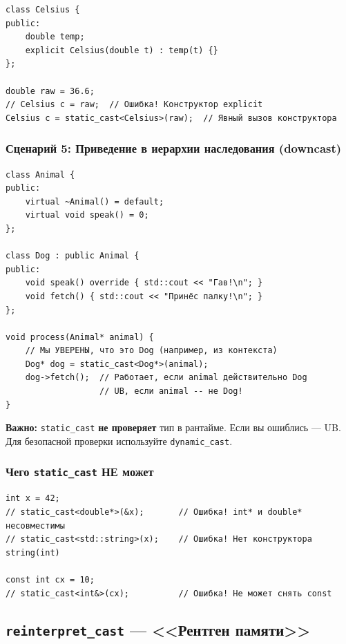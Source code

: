 \documentclass[a4paper,12pt]{article}
\begin{document}
\begin{lstlisting}
class Celsius {
public:
    double temp;
    explicit Celsius(double t) : temp(t) {}
};

double raw = 36.6;
// Celsius c = raw;  // Ошибка! Конструктор explicit
Celsius c = static_cast<Celsius>(raw);  // Явный вызов конструктора
\end{lstlisting}

\subsubsection{Сценарий 5: Приведение в иерархии наследования (downcast)}

\begin{lstlisting}
class Animal {
public:
    virtual ~Animal() = default;
    virtual void speak() = 0;
};

class Dog : public Animal {
public:
    void speak() override { std::cout << "Гав!\n"; }
    void fetch() { std::cout << "Принёс палку!\n"; }
};

void process(Animal* animal) {
    // Мы УВЕРЕНЫ, что это Dog (например, из контекста)
    Dog* dog = static_cast<Dog*>(animal);
    dog->fetch();  // Работает, если animal действительно Dog
                   // UB, если animal -- не Dog!
}
\end{lstlisting}

\textbf{Важно:} \texttt{static\_cast} \textbf{не проверяет} тип в рантайме.
Если вы ошиблись --- UB. Для безопасной проверки используйте \texttt{dynamic\_cast}.

\subsubsection{Чего \texttt{static\_cast} НЕ может}

\begin{lstlisting}
int x = 42;
// static_cast<double*>(&x);       // Ошибка! int* и double* несовместимы
// static_cast<std::string>(x);    // Ошибка! Нет конструктора string(int)

const int cx = 10;
// static_cast<int&>(cx);          // Ошибка! Не может снять const
\end{lstlisting}

\subsection{\texttt{reinterpret\_cast} --- <<Рентген памяти>>}
\end{document}
